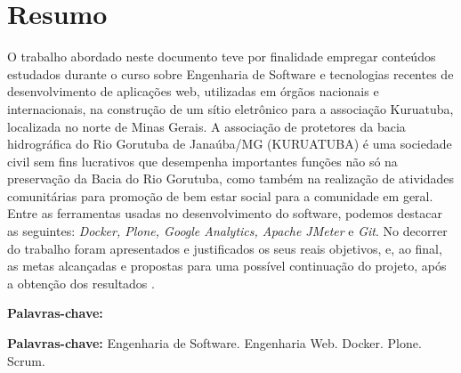 \chapter*{Resumo}

\vspace{0.4cm}

\noindent O trabalho abordado neste documento teve por finalidade empregar conteúdos estudados durante o curso sobre Engenharia de Software e tecnologias recentes de desenvolvimento de aplicações web, utilizadas em órgãos nacionais e internacionais, na construção de um sítio eletrônico para a associação Kuruatuba, localizada no norte de Minas Gerais. A associação de protetores da bacia hidrográfica do Rio Gorutuba de Janaúba/MG (KURUATUBA) é uma sociedade civil sem fins lucrativos que desempenha importantes funções não só na preservação da Bacia do Rio Gorutuba, como também na realização de atividades comunitárias para promoção de bem estar social para a comunidade em geral.
Entre as ferramentas usadas no desenvolvimento do software, podemos destacar as seguintes: \textit{Docker, Plone, Google Analytics, Apache JMeter} e \textit{Git}.  
No decorrer do trabalho foram apresentados e justificados os seus reais objetivos, e, ao final, as metas alcançadas e propostas para uma possível continuação do projeto, após a obtenção dos resultados .

\begin{labeling}{\textbf{Palavras-chave:}}
\item[\textbf{Palavras-chave:}] 
Engenharia de Software.
Engenharia Web.
Docker.
Plone.
Scrum.
\end{labeling}

